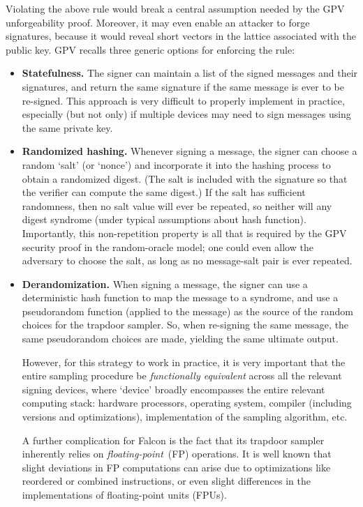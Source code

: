 \documentclass[11pt]{article}
\begin{document}
Violating the above rule would break a central assumption needed by
the GPV unforgeability proof. Moreover, it may even enable an attacker
to forge signatures, because it would reveal short vectors in the
lattice associated with the public key. GPV recalls three generic
options for enforcing the rule:
\begin{itemize}
\item \textbf{Statefulness.} The signer can maintain a list of the
  signed messages and their signatures, and return the same signature
  if the same message is ever to be re-signed. This approach is very
  difficult to properly implement in practice, especially (but not
  only) if multiple devices may need to sign messages using the same
  private key.

\item \textbf{Randomized hashing.} Whenever signing a message, the
  signer can choose a random `salt' (or `nonce') and incorporate it
  into the hashing process to obtain a randomized digest. (The salt is
  included with the signature so that the verifier can compute the
  same digest.) If the salt has sufficient randomness, then no salt
  value will ever be repeated, so neither will any digest syndrome
  (under typical assumptions about hash function). Importantly, this
  non-repetition property is all that is required by the GPV security
  proof in the random-oracle model; one could even allow the adversary
  to choose the salt, as long as no message-salt pair is ever
  repeated.

\item \textbf{Derandomization.} When signing a message, the signer can
  use a deterministic hash function to map the message to a syndrome,
  and use a pseudorandom function (applied to the message) as the
  source of the random choices for the trapdoor sampler. So, when
  re-signing the same message, the same pseudorandom choices are made,
  yielding the same ultimate output.

  However, for this strategy to work in practice, it is very important
  that the entire sampling procedure be \emph{functionally equivalent}
  across all the relevant signing devices, where `device' broadly
  encompasses the entire relevant computing stack: hardware
  processors, operating system, compiler (including versions and
  optimizations), implementation of the sampling algorithm, etc.

  A further complication for Falcon is the fact that its trapdoor
  sampler inherently relies on \emph{floating-point}~(FP)
  operations. It is well known that slight deviations in FP
  computations can arise due to optimizations like reordered or
  combined instructions, or even slight differences in the
  implementations of floating-point units (FPUs).
\end{itemize}
\end{document}

